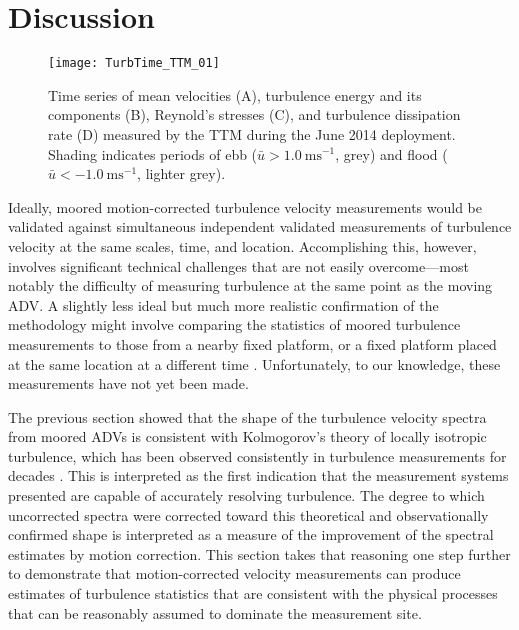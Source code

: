 
\section{Discussion}
\label{sec:discussion}

\begin{figure*}[t]
  \centering
  \texttt{[image: TurbTime\_TTM\_01]}
  \caption{Time series of mean velocities (A), turbulence energy and its components (B), Reynold's stresses (C), and turbulence dissipation rate (D) measured by the TTM during the June 2014 deployment. Shading indicates periods of ebb ($\bar{u}>1.0\ \mathrm{ms^{-1}}$, grey) and flood ($\bar{u}<-1.0\ \mathrm{ms^{-1}}$, lighter grey).}
  \label{fig:turbtime:ttm}
\end{figure*}

Ideally, moored motion-corrected turbulence velocity measurements would be validated against simultaneous independent validated measurements of turbulence velocity at the same scales, time, and location. Accomplishing this, however, involves significant technical challenges that are not easily overcome---most notably the difficulty of measuring turbulence at the same point as the moving ADV. A slightly less ideal but much more realistic confirmation of the methodology might involve comparing the statistics of moored turbulence measurements to those from a nearby fixed platform, or a fixed platform placed at the same location at a different time \cite[e.g., the ``tripod" platform described in][]{Thomson++2012}. Unfortunately, to our knowledge, these measurements have not yet been made.

The previous section showed that the shape of the turbulence velocity spectra from moored ADVs is consistent with Kolmogorov's theory of locally isotropic turbulence, which has been observed consistently in turbulence measurements for decades \cite[]{Kolmogorov1941c,Grant++1962,McMillan++2016}. This is interpreted as the first indication that the measurement systems presented are capable of accurately resolving turbulence. The degree to which uncorrected spectra were corrected toward this theoretical and observationally confirmed shape is interpreted as a measure of the improvement of the spectral estimates by motion correction. This section takes that reasoning one step further to demonstrate that motion-corrected velocity measurements can produce estimates of turbulence statistics that are consistent with the physical processes that can be reasonably assumed to dominate the measurement site.

